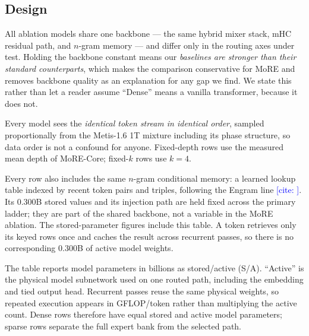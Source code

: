 \documentclass[11pt]{article}
\newcommand{\CITE}[1]{\textcolor{blue}{[cite: \detokenize{#1}]}}
\begin{document}
\subsection{Design}

All ablation models share one backbone --- the same hybrid mixer stack, mHC
residual path, and $n$-gram memory --- and differ only in the routing axes under
test. Holding the backbone constant means our \emph{baselines are stronger than
their standard counterparts}, which makes the comparison conservative for MoRE
and removes backbone quality as an explanation for any gap we find. We state this
rather than let a reader assume ``Dense'' means a vanilla transformer, because it
does not.

Every model sees the \emph{identical token stream in identical order}, sampled
proportionally from the Metis-1.6 1T mixture including its phase structure, so
data order is not a confound for anyone. Fixed-depth rows use the measured mean
depth of MoRE-Core; fixed-$k$ rows use $k=4$.

Every row also includes the same $n$-gram conditional memory: a learned lookup
table indexed by recent token pairs and triples, following the Engram line
\CITE{engram}. Its 0.300B stored values and its injection path are held fixed
across the primary ladder; they are part of the shared backbone, not a variable
in the MoRE ablation. The stored-parameter figures include this table. A token
retrieves only its keyed rows once and caches the result across recurrent passes,
so there is no corresponding 0.300B of active model weights.

The table reports model parameters in billions as stored/active (S/A).
``Active'' is the physical model subnetwork used on one routed path, including
the embedding and tied output head. Recurrent passes reuse the same physical
weights, so repeated execution appears in GFLOP/token rather than multiplying
the active count. Dense rows therefore have equal stored and active model
parameters; sparse rows separate the full expert bank from the selected path.
\end{document}
